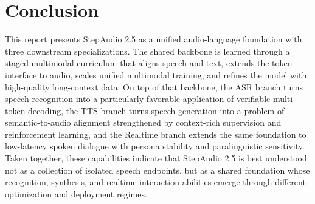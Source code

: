 \section{Conclusion}
\label{sec:conclusion}

This report presents StepAudio 2.5 as a unified audio-language foundation with three downstream specializations. The shared backbone is learned through a staged multimodal curriculum that aligns speech and text, extends the token interface to audio, scales unified multimodal training, and refines the model with high-quality long-context data. On top of that backbone, the ASR branch turns speech recognition into a particularly favorable application of verifiable multi-token decoding, the TTS branch turns speech generation into a problem of semantic-to-audio alignment strengthened by context-rich supervision and reinforcement learning, and the Realtime branch extends the same foundation to low-latency spoken dialogue with persona stability and paralinguistic sensitivity. Taken together, these capabilities indicate that StepAudio 2.5 is best understood not as a collection of isolated speech endpoints, but as a shared foundation whose recognition, synthesis, and realtime interaction abilities emerge through different optimization and deployment regimes.
